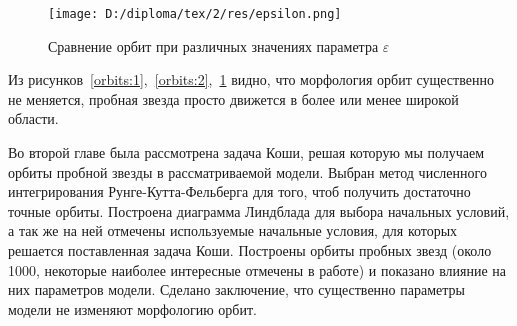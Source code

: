 {
\begin{figure}[H]
\centering
\begin{minipage}[t]{0.8\textwidth}
\centering
\texttt{[image: D:/diploma/tex/2/res/epsilon.png]}
\end{minipage}
\caption{Сравнение орбит при различных значениях параметра $\varepsilon$}\label{orbits:3}
\end{figure}
}
Из рисунков~\ref{orbits:1},~\ref{orbits:2},~\ref{orbits:3} видно, что морфология орбит существенно не меняется, пробная звезда просто движется в более или менее широкой области.
~\par
Во второй главе была рассмотрена задача Коши, решая которую мы получаем орбиты пробной звезды в рассматриваемой модели. Выбран метод численного интегрирования Рунге-Кутта-Фельберга для того, чтоб получить достаточно точные орбиты. Построена диаграмма Линдблада для выбора начальных условий, а так же на ней отмечены используемые начальные условия, для которых решается поставленная задача Коши. Построены орбиты пробных звезд (около 1000, некоторые наиболее интересные отмечены в работе) и показано влияние на них параметров модели. Сделано заключение, что существенно параметры модели не изменяют морфологию орбит.